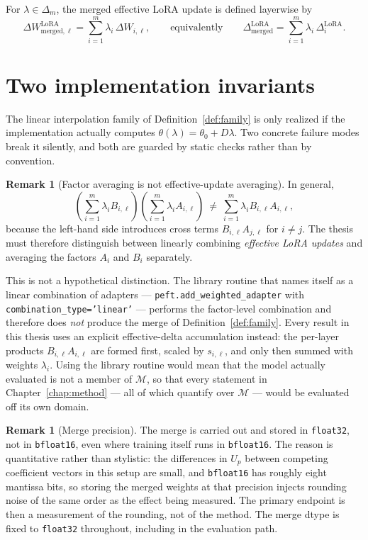 \documentclass[12pt,a4paper]{report}
\newcommand{\1}{\mathbf{1}}
\newcommand{\Mfam}{\mathcal{M}}
\theoremstyle{definition}
\newtheorem{remark}[definition]{Remark}
\begin{document}
For \(\lambda\in\Delta_m\), the merged effective LoRA update is defined layerwise by
\[
\Delta W^{\mathrm{LoRA}}_{\mathrm{merged},\ell}=\sum_{i=1}^m\lambda_i\,\Delta W_{i,\ell},
\qquad\text{equivalently}\qquad
\Delta^{\mathrm{LoRA}}_{\mathrm{merged}}=\sum_{i=1}^m\lambda_i\,\Delta_i^{\mathrm{LoRA}}.
\]

\section{Two implementation invariants}
\label{sec:merge-invariants}

The linear interpolation family of Definition~\ref{def:family} is only realized if the implementation actually computes \(\theta(\lambda)=\theta_0+D\lambda\). Two concrete failure modes break it silently, and both are guarded by static checks rather than by convention.

\begin{remark}[Factor averaging is not effective-update averaging]
\label{rem:merge-caveat}
In general,
\[
\left(\sum_{i=1}^m\lambda_i B_{i,\ell}\right)\left(\sum_{i=1}^m\lambda_i A_{i,\ell}\right)
\ \neq\
\sum_{i=1}^m\lambda_i B_{i,\ell}A_{i,\ell},
\]
because the left-hand side introduces cross terms \(B_{i,\ell}A_{j,\ell}\) for \(i\ne j\). The thesis must therefore distinguish between linearly combining \emph{effective LoRA updates} and averaging the factors \(A_i\) and \(B_i\) separately.

This is not a hypothetical distinction. The library routine that names itself as a linear combination of adapters --- \texttt{peft.add\_weighted\_adapter} with \texttt{combination\_type='linear'} --- performs the factor-level combination and therefore does \emph{not} produce the merge of Definition~\ref{def:family}. Every result in this thesis uses an explicit effective-delta accumulation instead: the per-layer products \(B_{i,\ell}A_{i,\ell}\) are formed first, scaled by \(s_{i,\ell}\), and only then summed with weights \(\lambda_i\). Using the library routine would mean that the model actually evaluated is not a member of \(\Mfam\), so that every statement in Chapter~\ref{chap:method} --- all of which quantify over \(\Mfam\) --- would be evaluated off its own domain.
\end{remark}

\begin{remark}[Merge precision]
\label{rem:merge-dtype}
The merge is carried out and stored in \texttt{float32}, not in \texttt{bfloat16}, even where training itself runs in \texttt{bfloat16}. The reason is quantitative rather than stylistic: the differences in \(U_p\) between competing coefficient vectors in this setup are small, and \texttt{bfloat16} has roughly eight mantissa bits, so storing the merged weights at that precision injects rounding noise of the same order as the effect being measured. The primary endpoint is then a measurement of the rounding, not of the method. The merge dtype is fixed to \texttt{float32} throughout, including in the evaluation path.
\end{remark}
\end{document}
